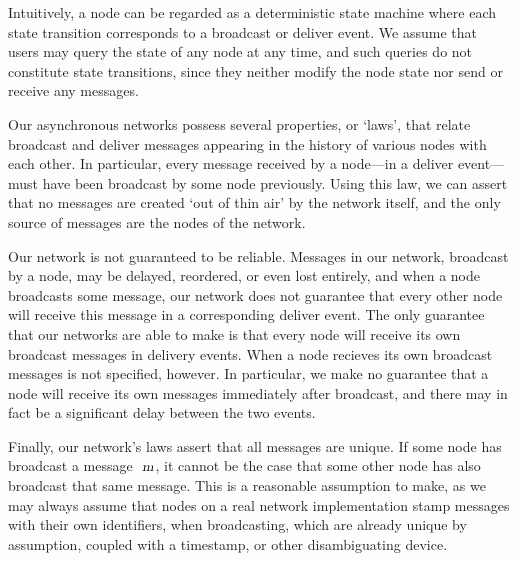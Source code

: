 \documentclass[acmlarge,review,anonymous]{acmart}\settopmatter{printfolios=true}
\begin{document}
Intuitively, a node can be regarded as a deterministic state machine where each state transition corresponds to a broadcast or deliver event.
We assume that users may query the state of any node at any time, and such queries do not constitute state transitions, since they neither modify the node state nor send or receive any messages.

Our asynchronous networks possess several properties, or `laws', that relate broadcast and deliver messages appearing in the history of various nodes with each other.
In particular, every message received by a node---in a deliver event---must have been broadcast by some node previously.
Using this law, we can assert that no messages are created `out of thin air' by the network itself, and the only source of messages are the nodes of the network.

Our network is not guaranteed to be reliable.
Messages in our network, broadcast by a node, may be delayed, reordered, or even lost entirely, and when a node broadcasts some message, our network does not guarantee that every other node will receive this message in a corresponding deliver event.
The only guarantee that our networks are able to make is that every node will receive its own broadcast messages in delivery events.
When a node recieves its own broadcast messages is not specified, however.
In particular, we make no guarantee that a node will receive its own messages immediately after broadcast, and there may in fact be a significant delay between the two events.

Finally, our network's laws assert that all messages are unique.
If some node has broadcast a message $\isa{m}$, it cannot be the case that some other node has also broadcast that same message.
This is a reasonable assumption to make, as we may always assume that nodes on a real network implementation stamp messages with their own identifiers, when broadcasting, which are already unique by assumption, coupled with a timestamp, or other disambiguating device.
\end{document}
